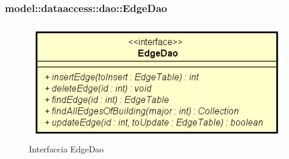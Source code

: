 \documentclass[../DefinizioneDiProdotto.tex]{subfiles}
\begin{document}
\subsubsection{model::dataaccess::dao::EdgeDao}

    \begin{figure}[H]
        \centering
        \includegraphics{img/EdgeDao.png}
        \caption{Interfaccia EdgeDao}\label{fig:model::dataaccess::dao::EdgeDao} 
    \end{figure}
\end{document}
